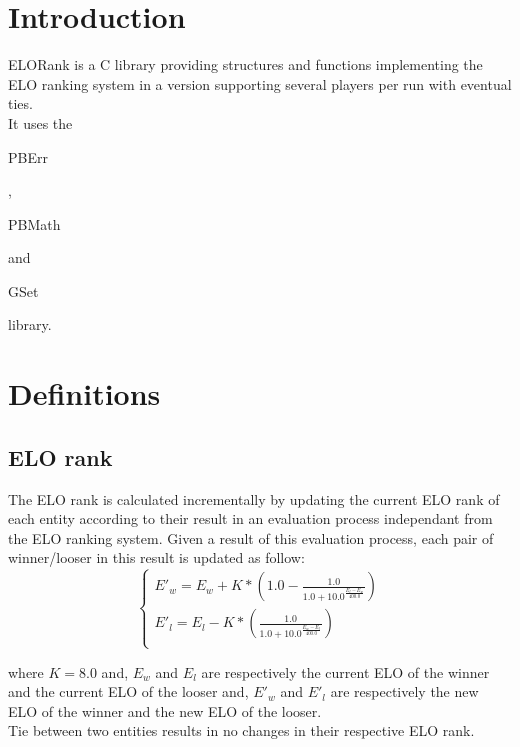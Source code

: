 \section*{Introduction}

ELORank is a C library providing structures and functions implementing the ELO ranking system in a version supporting several players per run with eventual ties.\\ 

It uses the \begin{ttfamily}PBErr\end{ttfamily}, \begin{ttfamily}PBMath\end{ttfamily} and \begin{ttfamily}GSet\end{ttfamily} library.\\

\section{Definitions}

\subsection{ELO rank}

The ELO rank is calculated incrementally by updating the current ELO rank of each entity according to their result in an evaluation process independant from the ELO ranking system. Given a result of this evaluation process, each pair of winner/looser in this result is updated as follow:\\

\begin{equation}
\left\lbrace
\begin{array}{l}
E'_w=E_w+K*\left(1.0-\frac{1.0}{1.0+10.0^{\frac{E_l-E_w}{400.0}}}\right)\\
E'_l=E_l-K*\left(\frac{1.0}{1.0+10.0^{\frac{E_w-E_l}{400.0}}}\right)\\
\end{array}
\right.
\end{equation}

where $K=8.0$ and, $E_w$ and $E_l$ are respectively the current ELO of the winner and the current ELO of the looser and, $E'_w$ and $E'_l$ are respectively the new ELO of the winner and the new ELO of the looser.\\

Tie between two entities results in no changes in their respective ELO rank.

